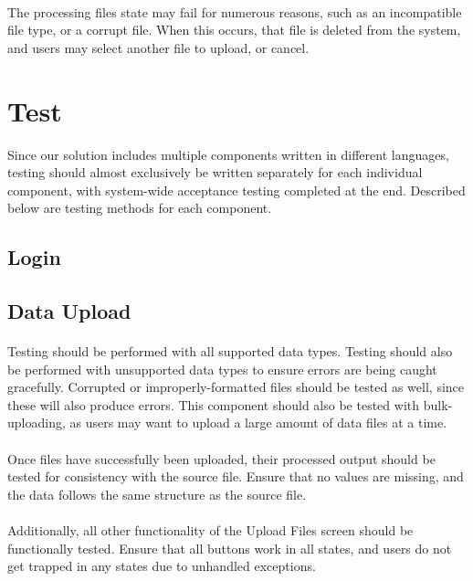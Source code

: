 \documentclass[12pt,oneside,letterpaper]{article}
\begin{document}
\paragraph{} The processing files state may fail for numerous reasons, such as an incompatible file type, or a corrupt file. When this occurs, that file is deleted from the system, and users may select another file to upload, or cancel.



\section{Test}
Since our solution includes multiple components written in different languages, testing should almost exclusively be written separately for each individual component, with system-wide acceptance testing completed at the end. Described below are testing methods for each component.

\subsection{Login}

\subsection{Data Upload}
\paragraph{} Testing should be performed with all supported data types. Testing should also be performed with unsupported data types to ensure errors are being caught gracefully. Corrupted or improperly-formatted files should be tested as well, since these will also produce errors. This component should also be tested with bulk-uploading, as users may want to upload a large amount of data files at a time.
\paragraph{} Once files have successfully been uploaded, their processed output should be tested for consistency with the source file. Ensure that no values are missing, and the data follows the same structure as the source file.
\paragraph{} Additionally, all other functionality of the Upload Files screen should be functionally tested. Ensure that all buttons work in all states, and users do not get trapped in any states due to unhandled exceptions.
\end{document}
